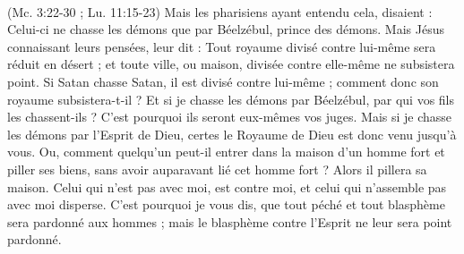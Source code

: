 \begin{multicols}{2}
{\\(Mc. 3:22-30 ; Lu. 11:15-23)}
Mais les pharisiens ayant entendu cela, disaient : Celui-ci ne chasse les démons que par Béelzébul, prince des démons.
Mais Jésus connaissant leurs pensées, leur dit : Tout royaume divisé contre lui-même sera réduit en désert ; et toute ville, ou maison, divisée contre elle-même ne subsistera point.
Si Satan chasse Satan, il est divisé contre lui-même ; comment donc son royaume subsistera-t-il ?
Et si je chasse les démons par Béelzébul, par qui vos fils les chassent-ils ? C’est pourquoi ils seront eux-mêmes vos juges.
Mais si je chasse les démons par l'Esprit de Dieu, certes le Royaume de Dieu est donc venu jusqu'à vous.
Ou, comment quelqu'un peut-il entrer dans la maison d'un homme fort et piller ses biens, sans avoir auparavant lié cet homme fort ? Alors il pillera sa maison.
Celui qui n'est pas avec moi, est contre moi, et celui qui n'assemble pas avec moi disperse.
C'est pourquoi je vous dis, que tout péché et tout blasphème sera pardonné aux hommes ; mais le blasphème contre l'Esprit ne leur sera point pardonné.

\end{multicols}
